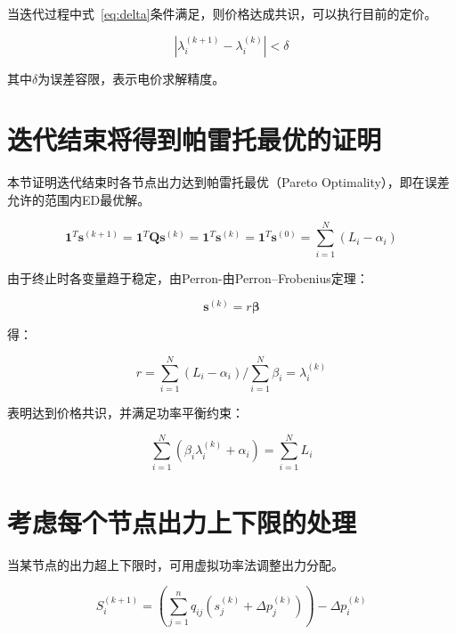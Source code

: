 当迭代过程中式~\ref{eq:delta}条件满足，则价格达成共识，可以执行目前的定价。

\begin{equation}
    \left|\lambda_{i}^{(k+1)}-\lambda_{i}^{(k)}\right|<\delta
    \label{eq:delta}    
\end{equation}

其中$\delta$为误差容限，表示电价求解精度。

\section{迭代结束将得到帕雷托最优的证明}

本节证明迭代结束时各节点出力达到帕雷托最优（Pareto Optimality），即在误差允许的范围内ED最优解。

\begin{equation}
    \mathbf{1}^{T} \mathbf{s}^{(k+1)}=\mathbf{1}^{T} \mathbf{Q} \mathbf{s}^{(k)}=\mathbf{1}^{T} \mathbf{s}^{(k)}=\mathbf{1}^{T} \mathbf{s}^{(0)}=\sum_{i=1}^{N}\left(L_{i}-\alpha_{i}\right)
\end{equation}

由于终止时各变量趋于稳定，由Perron-由Perron–Frobenius定理：

\begin{equation}
    \mathbf{s}^{(k)}=r \boldsymbol{\beta}
\end{equation}

得：

\begin{equation}
    r=\sum_{i=1}^{N}\left(L_{i}-\alpha_{i}\right) / \sum_{i=1}^{N} \beta_{i}=\lambda_{i}^{(k)}
\end{equation}

表明达到价格共识，并满足功率平衡约束：

\begin{equation}
    \sum_{i=1}^{N}\left(\beta_{i} \lambda_{i}^{(k)}+\alpha_{i}\right)=\sum_{i=1}^{N} L_{i}
\end{equation}

\section{考虑每个节点出力上下限的处理}

当某节点的出力超上下限时，可用虚拟功率法调整出力分配。

\begin{equation}
    S_{i}^{(k+1)}=\left(\sum_{j=1}^{n} q_{i j}\left(s_{j}^{(k)}+\Delta p_{j}^{(k)}\right)\right)-\Delta p_{i}^{(k)}
\end{equation}

